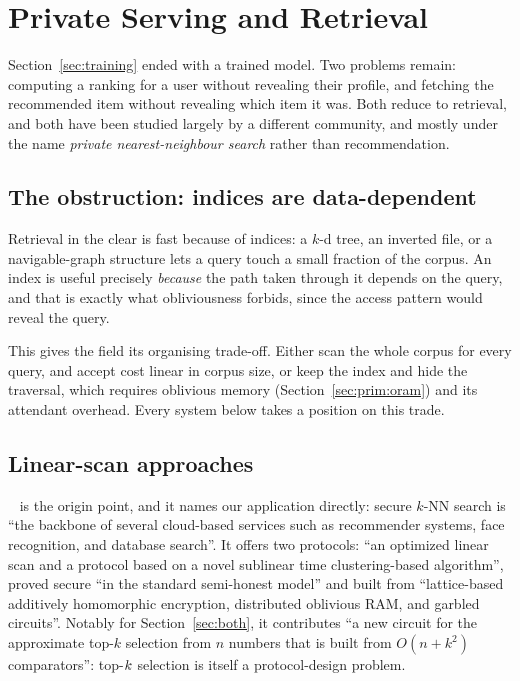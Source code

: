 \section{Private Serving and Retrieval}
\label{sec:retrieval}

Section~\ref{sec:training} ended with a trained model. Two problems remain: computing a ranking
for a user without revealing their profile, and fetching the recommended item without revealing
which item it was. Both reduce to retrieval, and both have been studied largely by a different
community, and mostly under the name \emph{private nearest-neighbour search} rather than
recommendation.

\subsection{The obstruction: indices are data-dependent}
\label{sec:retrieval:obstruction}

Retrieval in the clear is fast because of indices: a $k$-d tree, an inverted file, or a
navigable-graph structure lets a query touch a small fraction of the corpus. An index is useful
precisely \emph{because} the path taken through it depends on the query, and that is exactly
what obliviousness forbids, since the access pattern would reveal the query.

This gives the field its organising trade-off. Either scan the whole corpus for every query, and
accept cost linear in corpus size, or keep the index and hide the traversal, which requires
oblivious memory (Section~\ref{sec:prim:oram}) and its attendant overhead. Every system below
takes a position on this trade.

\subsection{Linear-scan approaches}
\label{sec:retrieval:linear}

\sanns~\cite{sanns2020} is the origin point, and it names our application directly: secure $k$-NN
search is ``the backbone of several cloud-based services such as recommender systems, face
recognition, and database search''. It offers two protocols: ``an optimized linear scan and a
protocol based on a novel sublinear time clustering-based algorithm'', proved secure ``in the
standard semi-honest model'' and built from ``lattice-based additively homomorphic encryption,
distributed oblivious RAM, and garbled circuits''. Notably for
Section~\ref{sec:both}, it contributes ``a new circuit for the approximate top-$k$ selection from
$n$ numbers that is built from $O(n + k^2)$ comparators'': top-$k$ selection is itself a
protocol-design problem.


